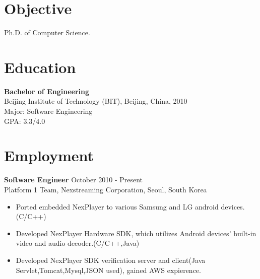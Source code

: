 \documentclass[margin]{res}
\begin{document}

\address{  Email: kimcherwoo@gmail.com\\Mobile: (+82)010-8301-0173 \\Work: (+82)02-2194-5187}
\address{  Nexstreaming Corporation \\  2nd Flr, Gwangseong Bldg, \\ 831-47Yeoksamdong Gangnam-gu \\Seoul, South Korea.\\Postcode: 135-080 }


\begin{resume}
 
\section{Objective}  Ph.D. of Computer Science. 

\section{Education} {\bf Bachelor of Engineering  } \\
                Beijing Institute of Technology (BIT), Beijing, China,  2010 	\\
                Major: Software Engineering \\
                GPA: 3.3/4.0
 
\section{Employment} 
				{ \bf Software Engineer} \hfill October 2010 - Present \\
                Platform 1 Team, Nexstreaming Corporation, Seoul, South Korea               
                 \begin{itemize}  \itemsep -2pt %
                 \item Ported embedded NexPlayer to various Samsung and LG android devices.(C/C++)
                \item   Developed NexPlayer Hardware SDK, which utilizes Android devices' built-in video and audio decoder.(C/C++,Java)
				\item   Developed NexPlayer SDK verification server and client(Java Servlet,Tomcat,Mysql,JSON used), gained AWS expierence.
                \end{itemize}
 

\end{resume}
\end{document}
